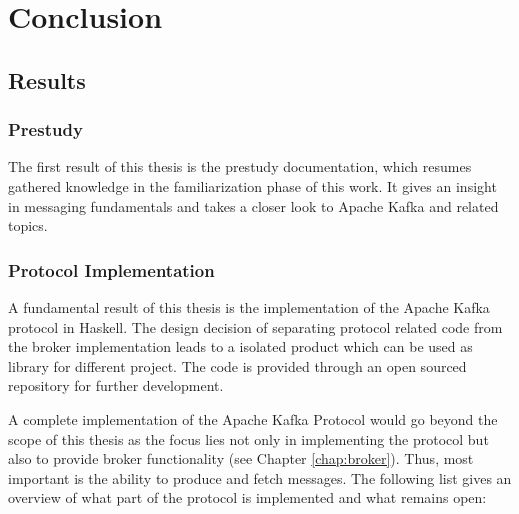 \chapter{Conclusion}
\section{Results}
\subsection{Prestudy}
The first result of this thesis is the prestudy documentation, which
resumes gathered knowledge in the familiarization phase of this work.
It gives an insight in messaging fundamentals and  takes a closer look to Apache
Kafka and related topics.

\subsection{Protocol Implementation}
A fundamental result of this thesis is the implementation of the Apache Kafka
protocol in Haskell. The design decision of separating protocol related code
from the broker implementation leads to a isolated product which can be used as
library for different project. The code is provided through an open sourced
repository for further development. 

A complete implementation of the Apache Kafka Protocol would go beyond the scope
of this thesis as the focus lies not only in implementing the protocol but also
to provide broker functionality (see Chapter \ref{chap:broker}). Thus, most
important is the ability to produce and fetch messages. The following list gives
an overview of what part of the protocol is implemented and what remains open:

